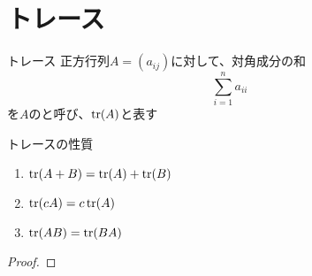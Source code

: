 \documentclass[../../../topic_linear-algebra]{subfiles}
\begin{document}
\sectionline
\section{トレース}

\begin{definition}{トレース}
  正方行列$A=(a_{ij})$に対して、対角成分の和
  \begin{equation*}
    \sum_{i=1}^n a_{ii}
  \end{equation*}
  を$A$のと呼び、$\tr(A)$と表す
\end{definition}

\begin{theorem}{トレースの性質}
  \begin{enumerate}[label=\romanlabel]
    \item $\tr(A+B) = \tr(A) + \tr(B)$
    \item $\tr(cA) = c\tr(A)$
    \item $\tr(AB) = \tr(BA)$
  \end{enumerate}
\end{theorem}

\begin{proof}
\end{proof}
\end{document}
